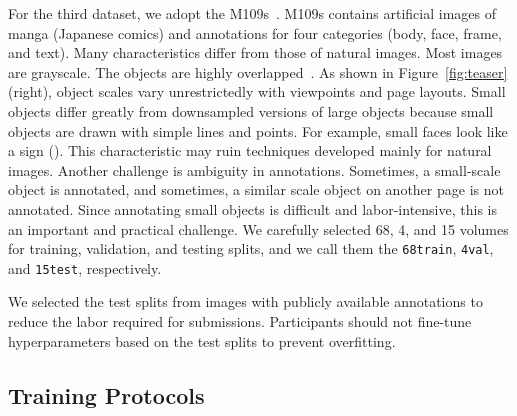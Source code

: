 \documentclass[10pt,twocolumn,letterpaper]{article}
\newcommand{\MangasAbbr}{M109s\xspace}
\begin{document}
For the third dataset, we adopt the \MangasAbbr~\cite{Manga109_Matsui_MTAP2017, Manga109_Aizawa_IEEEMM2020}.
\MangasAbbr contains artificial images of manga (Japanese comics) and annotations for four categories (body, face, frame, and text).
Many characteristics differ from those of natural images.
Most images are grayscale.
The objects are highly overlapped~\cite{Manga109_detection_Ogawa_2018}.
As shown in Figure~\ref{fig:teaser} (right), object scales vary unrestrictedly with viewpoints and page layouts.
Small objects differ greatly from downsampled versions of large objects
because small objects are drawn with simple lines and points.
For example, small faces look like a sign ().
This characteristic may ruin techniques developed mainly for natural images.
Another challenge is ambiguity in annotations.
Sometimes, a small-scale object is annotated, and sometimes, a similar scale object on another page is not annotated.
Since annotating small objects is difficult and labor-intensive, this is an important and practical challenge.
We carefully selected 68, 4, and 15 volumes for training, validation, and testing splits,
and we call them the \texttt{68train}, \texttt{4val}, and \texttt{15test}, respectively.

We selected the test splits from images with publicly available annotations
to reduce the labor required for submissions.
Participants should not fine-tune hyperparameters based on the test splits
to prevent overfitting.



\subsection{Training Protocols}
\label{sec:usb_training}
\end{document}
